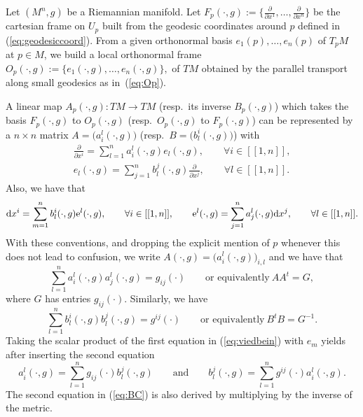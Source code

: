 \documentclass[10pt,a4paper]{amsart}
\numberwithin{equation}{section}
\theoremstyle{definition}
\begin{document}
Let $(M^n,g)$ be a Riemannian manifold. Let $F_p(\cdot,g):=\big\{\frac{\partial}{\partial x^1},\dots, \frac{\partial}{\partial x^n}\big\}$ be the cartesian frame on $U_p$ built from the geodesic coordinates around $p$ defined in (\ref{eq:geodesiccoord}). From a given orthonormal basis $e_1(p) ,\dots,e_n(p) $ of $T_pM$ at $p\in M$, we build a local orthonormal frame $O_p(\cdot, g):=\{e_1(\cdot, g),\dots,e_n(\cdot, g)\},$ of $TM$ obtained by the parallel transport along small geodesics as in~(\ref{eq:Op}).

A linear map $A_p(\cdot, g)\colon TM\to TM$ (resp.\ its inverse $B_p(\cdot,g)$) which takes the basis $F_p(\cdot, g)$ to $O_p(\cdot, g)$ (resp.\ $O_p(\cdot, g)$ to $F_p(\cdot, g)$) can be represented by a $n\times n$ matrix $A=\bigl( a_i^l(\cdot, g)\bigr)$ (resp.\ $B=\bigl(b_l^i(\cdot,g)\bigr) $) with
\begin{gather}
\frac{ \partial}{\partial x^i}=\sum_{l=1}^n a_i^l (\cdot, g) e_l(\cdot,g) ,\qquad \forall i\in [[1, n]],\nonumber\\
 e_l(\cdot,g)= \sum_{j=1}^nb_l^j(\cdot, g) \frac{\partial}{\partial x^j},\qquad \forall l\in [[1, n]].\label{eq:viedbein}
\end{gather}
 Also, we have that
\begin{equation*}%
{\rm d} x^i=\sum_{m=1}^n b_l^i(\cdot, g) {\rm e}^l(\cdot,g) ,\qquad \forall i\in [[1, n]],\qquad {\rm e}^l(\cdot,g)= \sum_{j=1}^na_j^l(\cdot, g) {\rm d} x^j,\qquad \forall l\in [[1, n]].
\end{equation*}
With these conventions, and dropping the explicit mention of $p$ whenever this does not lead to confusion, we write $A(\cdot, g)=\bigl(a_i^l(\cdot, g)\bigr)_{i,l}$ and we have that
\begin{equation}\label{eq:AAt}
\sum_{l=1}^n a_i^l(\cdot, g)a_j^l(\cdot, g)=g_{ij}(\cdot) \qquad\text{or equivalently}\ A A^t= G,
\end{equation}
where $G$ has entries $g_{ij}(\cdot)$. Similarly, we have
\begin{equation}\label{eq:BBt}
\sum_{l=1}^n b_l^i(\cdot,g) b_l^j(\cdot,g)=g^{ij}(\cdot)\qquad\text{or equivalently} \
B^t B=G^{-1}.
\end{equation}
Taking the scalar product of the first equation in (\ref{eq:viedbein}) with $e_m$ yields after inserting the second equation
\begin{equation}\label{eq:BC}
a_i^l(\cdot, g)= \sum_{l=1}^n g_{ij}(\cdot) b_l^j(\cdot, g) \qquad \text{and} \qquad b_l^j(\cdot, g)= \sum_{l=1}^n g^{ij}(\cdot) a_i^l(\cdot, g).
\end{equation}
The second equation in (\ref{eq:BC}) is also derived by multiplying by the inverse of the metric.
\end{document}
